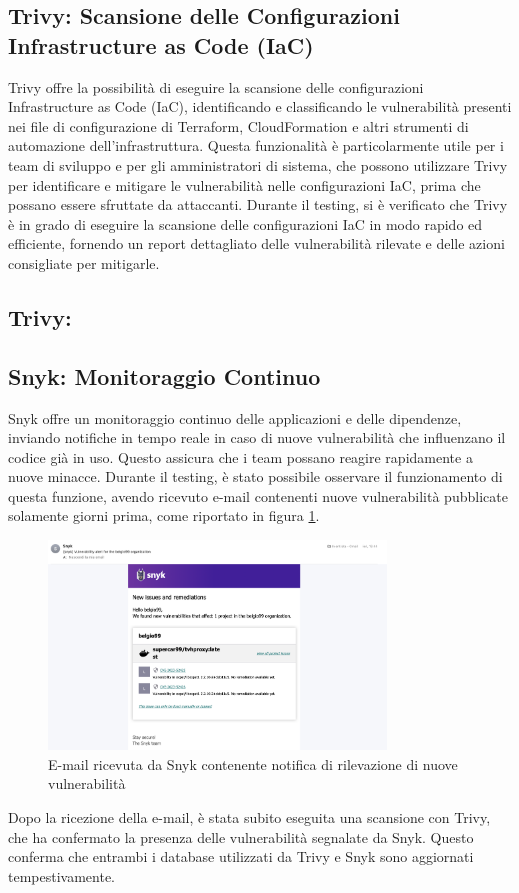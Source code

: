 \subsection{Trivy: Scansione delle Configurazioni Infrastructure as Code (IaC)}
Trivy offre la possibilità di eseguire la scansione delle configurazioni Infrastructure as Code (IaC), identificando e classificando le vulnerabilità presenti nei file di configurazione di Terraform, CloudFormation e altri strumenti di automazione dell'infrastruttura. Questa funzionalità è particolarmente utile per i team di sviluppo e per gli amministratori di sistema, che possono utilizzare Trivy per identificare e mitigare le vulnerabilità nelle configurazioni IaC, prima che possano essere sfruttate da attaccanti. Durante il testing, si è verificato che Trivy è in grado di eseguire la scansione delle configurazioni IaC in modo rapido ed efficiente, fornendo un report dettagliato delle vulnerabilità rilevate e delle azioni consigliate per mitigarle.
\subsection{Trivy:}

\subsection{Snyk: Monitoraggio Continuo}
Snyk offre un monitoraggio continuo delle applicazioni e delle dipendenze, inviando notifiche in tempo reale in caso di nuove vulnerabilità che influenzano il codice già in uso. Questo assicura che i team possano reagire rapidamente a nuove minacce. Durante il testing, è stato possibile osservare il funzionamento di questa funzione, avendo ricevuto e-mail contenenti nuove vulnerabilità pubblicate solamente giorni prima, come riportato in figura \ref{fig:snyk_email}.

\begin{figure}[H]
   \centering
   \includegraphics[width=0.8\textwidth]{immagini/capitolo2/snyk_email.png}
   \caption{E-mail ricevuta da Snyk contenente notifica di rilevazione di nuove vulnerabilità}
   \label{fig:snyk_email}
\end{figure}

Dopo la ricezione della e-mail, è stata subito eseguita una scansione con Trivy, che ha confermato la presenza delle vulnerabilità segnalate da Snyk. Questo conferma che entrambi i database utilizzati da Trivy e Snyk sono aggiornati tempestivamente.